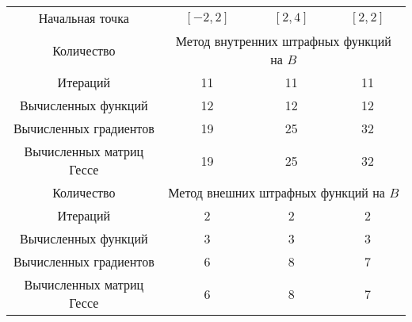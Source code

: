 \documentclass[12pt, a4paper]{article}
\begin{document}
\begin{table}[!h]
\begin{tabular}[c]{|c|c|c|c|}
		
	\end{tabular}
	\centering{}
	\caption{}
\end{table}

\begin{table}[!h]
	\centering
	\begin{tabular}[c]{|c|c|c|c|}
		\hline
		\multirow{2}{2.8cm}{Начальная точка}& \multirow{2}{2.7cm}{$[-2,2]$}&  \multirow{2}{2,7cm}{$[2,4]$}&
		\multirow{2}{2,7cm}{$[2,2]$}
		\\ & & & 
		\\\hline Количество & \multicolumn{3}{c|}{Метод внутренних штрафных функций на $B$} \\ \hline  
		\multirow{2}{2.8cm}{Итераций}& \multirow{2}{2,25cm}{11}&  \multirow{2}{2,25cm}{11}&
		\multirow{2}{2,25cm}{11}
		\\ & & &    \\ \hline
		\multirow{2}{2.8cm}{Вычисленных функций}& \multirow{2}{2,25cm}{12}&  \multirow{2}{2,25cm}{12}&
		\multirow{2}{2,25cm}{12}
		\\ & & &   \\ \hline
		\multirow{2}{2.8cm}{Вычисленных градиентов}& \multirow{2}{2,25cm}{19}&  \multirow{2}{2,25cm}{25}&
		\multirow{2}{2,25cm}{32}
		\\ & & &   \\ \hline
		\multirow{2}{2.8cm}{Вычисленных матриц Гессе}& \multirow{2}{2,25cm}{19}&  \multirow{2}{2,25cm}{25}&
		\multirow{2}{2,25cm}{32}
		\\ & & &   \\ 
		\hline Количество & \multicolumn{3}{c|}{Метод внешних штрафных функций на $B$} \\ \hline  
		\multirow{2}{2.8cm}{Итераций}& \multirow{2}{2,25cm}{2}&  \multirow{2}{2,25cm}{2}&
		\multirow{2}{2,25cm}{2}
		\\ & & &    \\ \hline
		\multirow{2}{2.8cm}{Вычисленных функций}& \multirow{2}{2,25cm}{3}&  \multirow{2}{2,25cm}{3}&
		\multirow{2}{2,25cm}{3}
		\\ & & &    \\ \hline
		\multirow{2}{2.8cm}{Вычисленных градиентов}& \multirow{2}{2,25cm}{6}&  \multirow{2}{2,25cm}{8}&
		\multirow{2}{2,25cm}{7}
		\\ & & &    \\ \hline
		\multirow{2}{2.8cm}{Вычисленных матриц Гессе}& \multirow{2}{2,25cm}{6}&  \multirow{2}{2,25cm}{8}&
		\multirow{2}{2,25cm}{7}
		\\ & & &   \\ \hline
		
		
	\end{tabular}
	\centering{}
	\caption{}
\end{table}
\end{document}
